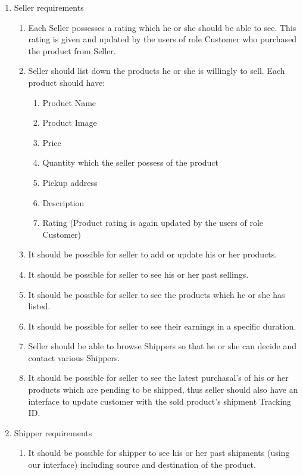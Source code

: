\documentclass[a4paper,12pt]{article}
\begin{document}
\begin{enumerate}
  \item Seller requirements
  \begin{enumerate}
    \item Each Seller possesses a rating which he or she should be able to see. This rating is given and updated by the users of role Customer who purchased the product from Seller.
    \item Seller should list down the products he or she is willingly to sell. Each product should have:
    \begin{enumerate}
      \item Product Name
      \item Product Image
      \item Price 
      \item Quantity which the seller possess of the product
      \item Pickup address
      \item Description
      \item Rating (Product rating is again updated by the users of role Customer)
    \end{enumerate}
    \item It should be possible for seller to add or update his or her products.
    \item It should be possible for seller to see his or her past sellings.
    \item It should be possible for seller to see the products which he or she has listed. 
    \item It should be possible for seller to see their earnings in a specific duration. 
    \item Seller should be able to browse Shippers so that he or she can decide and contact various Shippers.
    \item It should be possible for seller to see the latest purchasal's of his or her products which are pending to be shipped, thus seller should also have an interface to update customer with the sold product's shipment Tracking ID.
  \end{enumerate}
  \item Shipper requirements
    \begin{enumerate}
      \item It should be possible for shipper to see his or her past shipments (using our interface) including source and destination of the product.
    \end{enumerate}
\end{enumerate}
\end{document}
